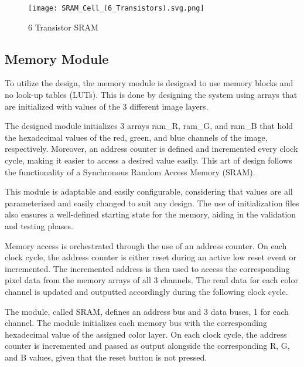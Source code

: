 \begin{figure}[H]
    \centering
    \texttt{[image: SRAM\_Cell\_(6\_Transistors).svg.png]}
    \caption{6 Transistor SRAM \cite{figseven}}
    \label{fig:SRAM6Transistor}  
\end{figure}

\subsection{Memory Module}
\par To utilize the design, the memory module is designed to use memory blocks and no look-up tables (LUTs). This is done by designing the system using arrays that are initialized with values of the 3 different image layers. \newline
\par The designed module initializes 3 arrays ram\_R, ram\_G, and ram\_B that hold the hexadecimal values of the red, green, and blue channels of the image, respectively. Moreover, an address counter is defined and incremented every clock cycle, making it easier to access a desired value easily. This art of design follows the functionality of a Synchronous Random Access Memory (SRAM). \newline
\par This module is adaptable and easily configurable, considering that values are all parameterized and easily changed to suit any design.  The use of initialization files also ensures a well-defined starting state for the memory, aiding in the validation and testing phases. \newline
\par Memory access is orchestrated through the use of an address counter. On each clock cycle, the address counter is either reset during an active low reset event or incremented. The incremented address is then used to access the corresponding pixel data from the memory arrays of all 3 channels. The read data for each color channel is updated and outputted accordingly during the following clock cycle. \newline
\par The module, called SRAM, defines an address bus and 3 data buses, 1 for each channel. The module initializes each memory bus with the corresponding hexadecimal value of the assigned color layer. On each clock cycle, the address counter is incremented and passed as output alongside the corresponding R, G, and B values, given that the reset button is not pressed.  \newline

